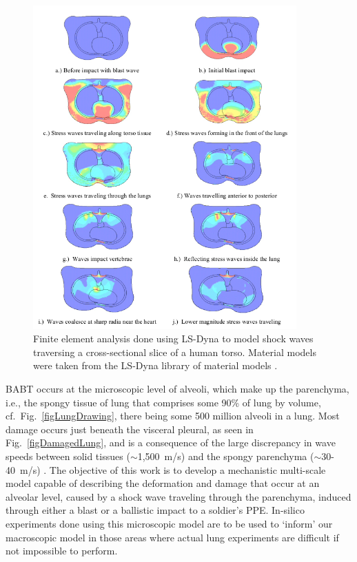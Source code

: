 \begin{figure}
    \centering\includegraphics[width=0.9\textwidth]{figures/shockWaveInTorso.png}
    \caption{Finite element analysis done using LS-Dyna to model shock waves traversing a cross-sectional slice of a human torso.  Material models were taken from the LS-Dyna library of material models \cite{Josey10}.}
    \label{figShockWaveInLung}
\end{figure}

BABT occurs at the microscopic level of alveoli, which make up the parenchyma, i.e., the spongy tissue of lung that comprises some 90\% of lung by volume, cf.\ Fig.~\ref{figLungDrawing}, there being some 500 million alveoli in a lung.  Most damage occurs just beneath the visceral pleural, as seen in Fig.~\ref{figDamagedLung}, and is a consequence of the large discrepancy in wave speeds between solid tissues ($\sim$1,500~m/s) and the spongy parenchyma ($\sim$30-40~m/s) \cite{Stuhmiller08}.  The objective of this work is to develop a mechanistic multi-scale model capable of describing the deformation and damage that occur at an alveolar level, caused by a shock wave traveling through the parenchyma, induced through either a blast or a ballistic impact to a soldier's PPE.  In-silico experiments done using this microscopic model are to be used to `inform' our macroscopic model in those areas where actual lung experiments are difficult if not impossible to perform.

